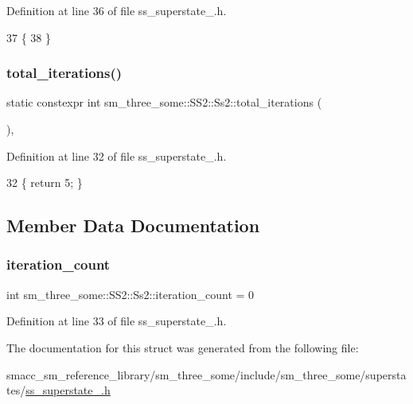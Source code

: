 Definition at line 36 of file ss\+\_\+superstate\+\_.\+h.


\begin{DoxyCode}
37     \{
38     \}
\end{DoxyCode}
\mbox{\label{structsm__three__some_1_1SS2_1_1Ss2_a40a682abb6bcacffdc2886c531aa8e10}} 
\subsubsection{\texorpdfstring{total\+\_\+iterations()}{total\_iterations()}}
{\footnotesize\ttfamily static constexpr int sm\+\_\+three\+\_\+some\+::\+S\+S2\+::\+Ss2\+::total\+\_\+iterations (\begin{DoxyParamCaption}{ }\end{DoxyParamCaption})\hspace{0.3cm}{\ttfamily [inline]}, {\ttfamily [static]}}



Definition at line 32 of file ss\+\_\+superstate\+\_.\+h.


\begin{DoxyCode}
32 \{ \textcolor{keywordflow}{return} 5; \}
\end{DoxyCode}


\subsection{Member Data Documentation}
\mbox{\label{structsm__three__some_1_1SS2_1_1Ss2_ad0f43df403bcb029afb07a0f52699c60}} 
\subsubsection{\texorpdfstring{iteration\+\_\+count}{iteration\_count}}
{\footnotesize\ttfamily int sm\+\_\+three\+\_\+some\+::\+S\+S2\+::\+Ss2\+::iteration\+\_\+count = 0}



Definition at line 33 of file ss\+\_\+superstate\+\_.\+h.



The documentation for this struct was generated from the following file\+:\begin{DoxyCompactItemize}
\item 
smacc\+\_\+sm\+\_\+reference\+\_\+library/sm\+\_\+three\+\_\+some/include/sm\+\_\+three\+\_\+some/superstates/\hyperlink{sm__three__some_2include_2sm__three__some_2superstates_2ss__superstate__2_8h}{ss\+\_\+superstate\+\_.\+h}\end{DoxyCompactItemize}
